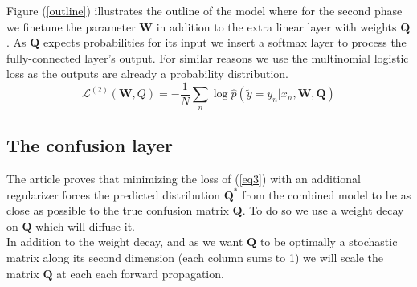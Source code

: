 \documentclass[10pt,twocolumn,letterpaper]{article}
\newcommand{\LL}{\mathcal{L}}
\newcommand{\Q}{\mathbf{Q}}
\newcommand{\W}{\mathbf{W}}
\begin{document}
\begin{figure}[H]
\end{figure}
Figure (\ref{outline}) illustrates the outline of the model where for the second phase we finetune the parameter $\W$ in addition to the extra linear layer with weights $\Q$. As $\Q$ expects probabilities for its input we insert a softmax layer to process the fully-connected layer's output. For similar reasons we use the multinomial logistic loss as the outputs are already a probability distribution.
\begin{equation}
\LL^{(2)}(\W,Q)=-\frac{1}{N}\sum_n\log \hat p(\tilde y=y_n|x_n,\W,\Q)
\label{eq3}
\end{equation}

\subsection{The confusion layer}
The article proves that minimizing the loss of (\ref{eq3}) with an additional regularizer forces the predicted distribution $\Q^*$ from the combined model to be as close as possible to the true confusion matrix $\Q$. To do so we use a weight decay on $\Q$ which will diffuse it.\\

In addition to the weight decay, and as we want $\Q$ to be optimally a stochastic matrix along its second dimension (each column sums to 1) we will scale the matrix $\Q$ at each each forward propagation.
\end{document}
